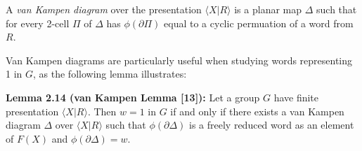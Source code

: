 \documentclass[12pt]{article}
\newcommand{\vs}{\vskip10pt}
\begin{document}
	\vs
	
	A \textit{van Kampen diagram} over the presentation $\langle X \vert R \rangle$ is a planar map $\Delta$ such that for every 2-cell $\Pi$ of $\Delta$ has $\phi(\partial \Pi)$ equal to a cyclic permuation of a word from $R$. 
	
	\vs 
	
	Van Kampen diagrams are particularly useful when studying words representing 1 in $G$, as the following lemma illustrates: 
	
	\vs 
	
	\textbf{Lemma 2.14 (van Kampen Lemma [13]):} Let a group $G$ have finite presentation $\langle X \vert R \rangle$. Then $w = 1$ in $G$ if and only if there exists a van Kampen diagram $\Delta$ over $\langle X \vert R \rangle$ such that $\phi(\partial \Delta)$ is a freely reduced word as an element of $F(X)$ and $\phi(\partial \Delta) = w$.
	
\end{document}
